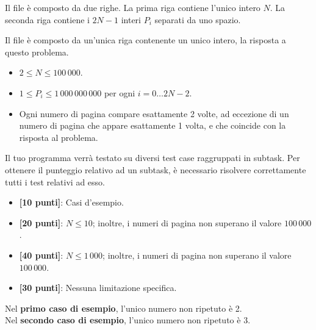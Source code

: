 \InputFile
Il file  è composto da due righe. La prima riga contiene l'unico intero $N$. La seconda riga contiene i $2N - 1$ interi $P_i$ separati da uno spazio.

\OutputFile
Il file \outputfile{} è composto da un'unica riga contenente un unico intero, la risposta a questo problema.

\Constraints
\begin{itemize}[nolistsep, itemsep=2mm]
	\item $2 \le N \le 100\,000$.
	\item $1 \le P_i \le 1\,000\,000\,000$ per ogni $i=0\ldots 2N-2$.
	\item Ogni numero di pagina compare esattamente 2 volte, ad eccezione di un numero di pagina che appare esattamente 1 volta, e che coincide con la risposta al problema.
\end{itemize}

\Scoring
Il tuo programma verrà testato su diversi test case raggruppati in subtask.
Per ottenere il punteggio relativo ad un subtask, è necessario risolvere
correttamente tutti i test relativi ad esso.

\begin{itemize}[nolistsep,itemsep=2mm]
  \item \textbf{ [10 punti]}: Casi d'esempio.
  \item \textbf{ [20 punti]}: $N \leq 10$; inoltre, i numeri di pagina non superano il valore $100\,000$.
  \item \textbf{ [40 punti]}: $N \leq 1\,000$; inoltre, i numeri di pagina non superano il valore $100\,000$.
  \item \textbf{ [30 punti]}: Nessuna limitazione specifica.
\end{itemize}

\Examples
\begin{example}
%
\end{example}
\begin{example}
%
\end{example}


\Explanation
Nel \textbf{primo caso di esempio}, l'unico numero non ripetuto è 2.\\[2mm]
Nel \textbf{secondo caso di esempio}, l'unico numero non ripetuto è 3.
